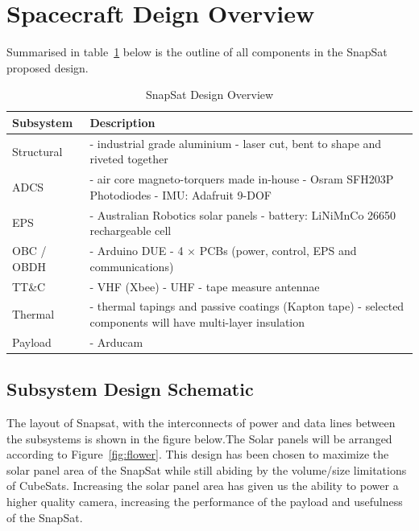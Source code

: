 \section{Spacecraft Deign Overview}
Summarised in table~\ref{tab:designoverview} below is the outline of all components in the SnapSat proposed design.

\begin{table}[H]
    \centering
    \caption{SnapSat Design Overview}
    \vspace{0.15cm}
    \label{tab:designoverview}
    {\renewcommand{\arraystretch}{1.4}%
        \begin{tabular}{|>{\arraybackslash}m{3cm}|>{\arraybackslash}m{10cm}|}
            \hline
            \textbf{Subsystem} & \textbf{Description} \\ \hline\hline
            Structural & - industrial grade aluminium \newline - laser cut, bent to shape and riveted together \\\hline
            ADCS & - air core magneto-torquers made in-house \newline - Osram SFH203P Photodiodes \newline - IMU: Adafruit 9-DOF  \\\hline
            EPS & - Australian Robotics solar panels \newline - battery: LiNiMnCo 26650 rechargeable cell  \\\hline
            OBC / OBDH & - Arduino DUE \newline - 4 $\times$ PCBs (power, control, EPS and communications)  \\\hline
           TT\&C & - VHF (Xbee) \newline - UHF \newline - tape measure antennae \\\hline
           Thermal & - thermal tapings and passive coatings (Kapton tape) \newline - selected components will have multi-layer insulation \\\hline
           Payload & - Arducam \\\hline
        \end{tabular} } 
    \end{table}
    
\subsection{Subsystem Design Schematic}
The layout of Snapsat, with the interconnects of power and data lines between the subsystems is shown in the figure below.The Solar panels will be arranged according to Figure~\ref{fig:flower}.  This design has been chosen to maximize the solar panel area of the SnapSat while still abiding by the volume/size limitations of CubeSats.  Increasing the solar panel area has given us the ability to power a higher quality camera, increasing the performance of the payload and usefulness of the SnapSat.


